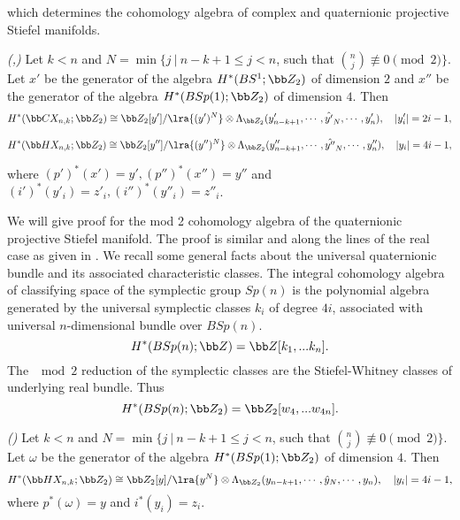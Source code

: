 which determines the cohomology algebra of complex and quaternionic projective Stiefel manifolds.
\begin{theorem}{\em (\cite[Theorem A]{Ru69},\cite[Theorem 5]{Zhu-Pop2022})}
Let $k<n$ and $N=\min\{j~|~n-k+1\leq j< n$, such that $ \binom{n}{j} \not\equiv 0 \pmod 2\}$. Let $x'$ be the generator of the algebra $H^*(BS^1; \bb Z_2)$ of dimension $2$ and $x''$ be the generator of the algebra $H^*(BSp(1); \bb Z_2)$ of dimension $4$. Then 
\[H^*(\bb  CX_{n,k}; \bb Z_2)\cong \bb Z_2[y']/\lra{(y')^N}\otimes \Lambda_{\bb Z_{2}}(y'_{n-k+1},\cdots, \hat{y'}_{N}, \cdots, y'_{n}),\quad   |y'_i|=2i-1,\]

\[H^*(\bb  HX_{n,k}; \bb Z_2)\cong \bb Z_2[y'']/\lra{(y'')^N}\otimes \Lambda_{\bb Z_{2}}(y''_{n-k+1}, \cdots,\hat{y''}_{N},\cdots,y''_{n}),\quad   |y_i|=4i-1,\]

where $(p')^*(x')=y', (p'')^*(x'')=y''$ and $(i')^*(y'_i)=z'_i, (i'')^*(y''_i)=z''_i$.
\end{theorem}

We will give proof for the mod 2 cohomology algebra of the quaternionic projective Stiefel manifold. The proof is similar and along the lines of the real case as given in \cite{GH68}. We recall some general facts about the universal quaternionic bundle and its associated characteristic classes. The integral cohomology algebra of classifying space of the symplectic group $Sp(n)$ is the polynomial algebra generated by the universal symplectic classes $k_i$ of degree $4i$, associated with universal $n$-dimensional bundle over $BSp(n)$.
\[H^*(BSp(n);\bb Z)=\bb Z[k_1,...k_n].\]
 The $\mod 2$ reduction of the symplectic classes are the Stiefel-Whitney classes of underlying real bundle. Thus 
 \[H^*(BSp(n);\bb Z_2)=\bb Z_2[w_4,...w_{4n}].\] 
 
\begin{theorem}{\em (\cite[Theorem 5]{Zhu-Pop2022})}\label{Quaternion_cohomology}
Let $k<n$ and $N=\min\{j~|~n-k+1\leq j< n$, such that $ \binom{n}{j} \not\equiv 0 \pmod 2\}$. Let $\omega$ be the generator of the algebra $H^*(BSp(1); \bb Z_2)$ of dimension $4$. Then 
\[H^*(\bb  HX_{n,k}; \bb Z_2)\cong \bb Z_2[y]/\lra{y^N}\otimes \Lambda_{\bb Z_{2}}(y_{n-k+1}, \cdots,\hat{y}_{N},\cdots,y_{n}),\quad   |y_i|=4i-1,\] where $p^*(\omega)=y$ and $i^*(y_i)=z_i$.
\end{theorem}

